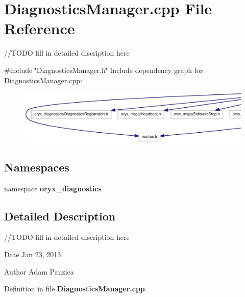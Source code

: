 \section{\-Diagnostics\-Manager.\-cpp \-File \-Reference}
\label{DiagnosticsManager_8cpp}


//\-T\-O\-D\-O fill in detailed discription here  


{\ttfamily \#include \char`\"{}\-Diagnostics\-Manager.\-h\char`\"{}}\*
\-Include dependency graph for \-Diagnostics\-Manager.\-cpp\-:
\nopagebreak
\begin{figure}[H]
\begin{center}
\leavevmode
\includegraphics[width=350pt]{DiagnosticsManager_8cpp__incl}
\end{center}
\end{figure}
\subsection*{\-Namespaces}
\begin{DoxyCompactItemize}
\item 
namespace {\bf oryx\-\_\-diagnostics}
\end{DoxyCompactItemize}


\subsection{\-Detailed \-Description}
//\-T\-O\-D\-O fill in detailed discription here \begin{DoxyDate}{\-Date}
\-Jan 23, 2013 
\end{DoxyDate}
\begin{DoxyAuthor}{\-Author}
\-Adam \-Panzica 
\end{DoxyAuthor}


\-Definition in file {\bf \-Diagnostics\-Manager.\-cpp}.

